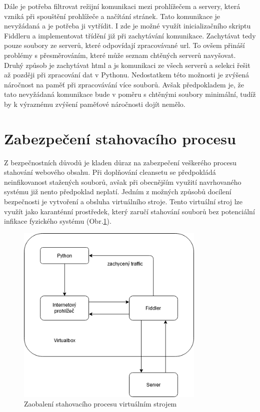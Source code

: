 \documentclass[thesis=M,czech,hidelinks]{FITthesis}[2013/05/06]
\begin{document}
Dále je potřeba filtrovat režijní komunikaci mezi prohlížečem a servery, která vzniká při spouštění prohlížeče a načítání stránek. Tato komunikace je nevyžádaná a je potřeba ji vytřídit. I zde je možné využít inicializačního skriptu Fiddleru a implementovat třídění již při zachytávání komunikace. Zachytávat tedy pouze soubory ze serverů, které odpovídají zpracovávané url. To ovšem přináší problémy s přesměrováním, které může seznam chtěných serverů navyšovat. Druhý způsob je zachytávat html a js komunikaci ze všech serverů a selekci řešit až později při zpracování dat v Pythonu. Nedostatkem této možnosti je zvýšená náročnost na paměť při zpracovávání více souborů. Avšak předpokladem je, že tato nevyžádaná komunikace bude v poměru s chtěnými soubory minimální, tudíž by k výraznému zvýšení paměťové náročnosti dojít nemělo.





\section{Zabezpečení stahovacího procesu}\label{sec:zabezpeceni}
Z bezpečnostních důvodů je kladen důraz na zabezpečení veškerého procesu stahování webového obsahu. Při doplňování cleansetu se předpokládá neinfikovanost stažených souborů, avšak při obecnějším využití navrhovaného systému již nento předpoklad neplatí. Jedním z možných způsobů docílení bezpečnosti je vytvoření a obsluha virtuálního stroje. Tento virtuální stroj lze využít jako karanténní prostředek, který zaručí stahování souborů bez potenciální infikace fyzického systému (Obr.\ref{fig:virtualbox}).

\begin{figure}[h]
	\centering
	\includegraphics[width=9cm]{pictures/virtualbox.png}
	\caption{Zaobalení stahovacího procesu virtuálním strojem}
	\label{fig:virtualbox}
\end{figure}
\end{document}
